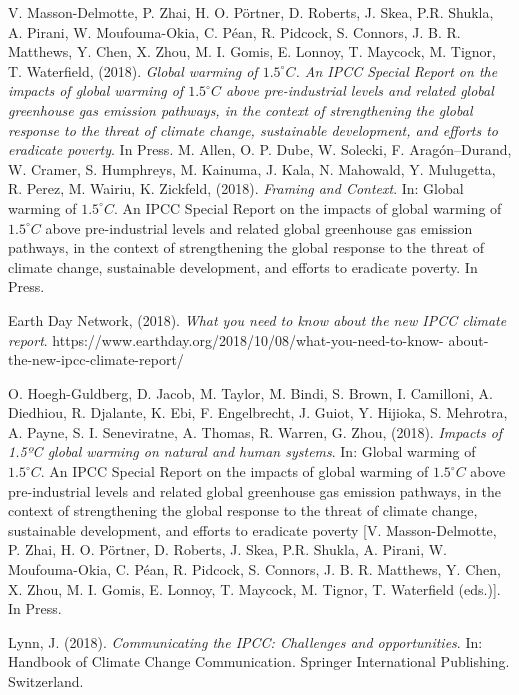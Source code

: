 \documentclass{article}
\begin{document}
\begin{thebibliography}{9}

V. Masson-Delmotte, P. Zhai, H. O. Pörtner, D. Roberts, J. Skea, P.R. Shukla, A. Pirani, W. Moufouma-Okia, C. Péan, R. Pidcock, S. Connors, J. B. R. Matthews, Y. Chen, X. Zhou, M. I. Gomis, E. Lonnoy, T. Maycock, M. Tignor, T. Waterfield, (2018). \emph{Global warming of $1.5^{\circ}C$. An IPCC Special Report on the impacts of global warming of $1.5^{\circ}C$ above pre-industrial levels and related global greenhouse gas emission pathways, in the context of strengthening the global response to the threat of climate change, sustainable development, and efforts to eradicate poverty}. In Press.
M. Allen, O. P. Dube, W. Solecki, F. Aragón–Durand, W. Cramer, S. Humphreys, M. Kainuma, J. Kala, N. Mahowald, Y. Mulugetta, R. Perez, M. Wairiu, K. Zickfeld, (2018). \emph{Framing and Context}. In: Global warming of $1.5^{\circ}C$. An IPCC Special Report on the impacts of global warming of $1.5^{\circ}C$ above pre-industrial levels and related global greenhouse gas emission pathways, in the context of strengthening the global response to the threat of climate change, sustainable development, and efforts to eradicate poverty. In Press.

Earth Day Network, (2018). \emph{What you need to know about the new IPCC climate report}. https://www.earthday.org/2018/10/08/what-you-need-to-know-
about-the-new-ipcc-climate-report/

O. Hoegh-Guldberg, D. Jacob, M. Taylor, M. Bindi, S. Brown, I. Camilloni, A. Diedhiou, R. Djalante, K. Ebi, F. Engelbrecht, J. Guiot, Y. Hijioka, S. Mehrotra, A. Payne, S. I. Seneviratne, A. Thomas, R. Warren, G. Zhou, (2018). \emph{Impacts of 1.5ºC global warming on natural and human systems}. In: Global warming of $1.5^{\circ}C$. An IPCC Special Report on the impacts of global warming of $1.5^{\circ}C$ above pre-industrial levels and related global greenhouse gas emission pathways, in the context of strengthening the global response to the threat of climate change, sustainable development, and efforts to eradicate poverty [V. Masson-Delmotte, P. Zhai, H. O. Pörtner, D. Roberts, J. Skea, P.R. Shukla, A. Pirani, W. Moufouma-Okia, C. Péan, R. Pidcock, S. Connors, J. B. R. Matthews, Y. Chen, X. Zhou, M. I. Gomis, E. Lonnoy, T. Maycock, M. Tignor, T. Waterfield (eds.)]. In Press.

Lynn, J. (2018). \emph{Communicating the IPCC: Challenges and opportunities}. In: Handbook of Climate Change Communication. Springer International Publishing. Switzerland.
\end{thebibliography}
\end{document}

